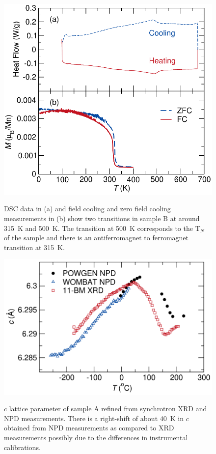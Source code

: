 \documentclass[letterpaper,10pt,doublespacing,edeposit]{uiucthesis2020}
\begin{document}
\begin{mainmatter}
\begin{figure}[h]
\centering\includegraphics[width=0.7\columnwidth]{figures/ch7/suppl_sampleC_DSC_SQUID_cropped.pdf} \\
\caption{\label{fig:DSC_SQUID_B}
DSC data in (a) and field cooling and zero field cooling measurements in (b) show two transitions in sample B at around 315~K and 500~K. The transition at 500~K corresponds to the T$_N$ of the sample and there is an antiferromagnet to ferromagnet transition at 315~K.
} 
\end{figure}

\begin{figure}[h]
\centering\includegraphics[width=0.7\columnwidth]{figures/ch7/supplementary_lattice_parameter_cropped.pdf} \\
\caption{\label{fig:lattice_param}
$c$ lattice parameter of sample A refined from synchrotron XRD and NPD measurements. There is a right-shift of about 40~K in $c$ obtained from NPD measurements as compared to XRD measurements possibly due to the differences in instrumental calibrations.
} 
\end{figure}




\end{mainmatter}
\end{document}
